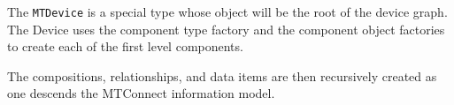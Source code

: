 The \texttt{MTDevice} is a special type whose object will be the root of the device graph.
The Device uses the component type factory and the component object factories to create each of the first level components.

The compositions, relationships, and data items are then recursively created as one descends the MTConnect information model.